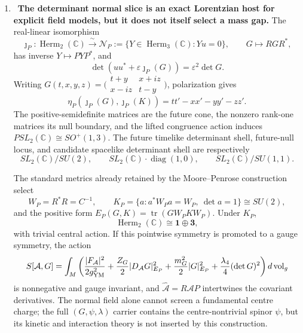 \begin{enumerate}[leftmargin=1.8em,itemsep=.65em]
\item \Verified\ \textbf{The determinant normal slice is an exact Lorentzian
host for explicit field models, but it does not itself select a mass gap.}
The real-linear isomorphism
\[
 \jmath_P:\operatorname{Herm}_2(\mathbb C)\xrightarrow{\ \sim\ }
 \mathcal N_P:=\{Y\in\operatorname{Herm}_3(\mathbb C):Yu=0\},
 \qquad G\longmapsto RGR^*,
\]
has inverse \(Y\mapsto PYP^*\), and
\[
 \det(uu^*+\varepsilon\jmath_P(G))=\varepsilon^2\det G.
\]
Writing
\(G(t,x,y,z)=
\bigl(\begin{smallmatrix}t+y&x+iz\\x-iz&t-y\end{smallmatrix}\bigr)\),
polarization gives
\[
 \eta_P(\jmath_P(G),\jmath_P(K))=tt'-xx'-yy'-zz'.
\]
The positive-semidefinite matrices are the future cone, the nonzero rank-one
matrices its null boundary, and the lifted congruence action induces
\(PSL_2(\mathbb C)\cong SO^+(1,3)\).  The future timelike determinant shell,
future-null locus, and candidate spacelike determinant shell are respectively
\[
 SL_2(\mathbb C)/SU(2),\qquad
 SL_2(\mathbb C)\cdot\operatorname{diag}(1,0),\qquad
 SL_2(\mathbb C)/SU(1,1).
\]

The standard metrics already retained by the Moore--Penrose construction
select
\[
 W_P=R^*R=C^{-1},\qquad
 K_P=\{a:a^*W_Pa=W_P,\ \det a=1\}\cong SU(2),
\]
and the positive form
\(E_P(G,K)=\operatorname{tr}(GW_PKW_P)\).  Under \(K_P\),
\[
 \operatorname{Herm}_2(\mathbb C)
 \cong\boldsymbol1\oplus\boldsymbol3,
\]
with trivial central action.  If this pointwise symmetry is promoted to a
gauge symmetry, the action
\[
 S[\mathcal A,G]=\int_M\left(
 \frac{|F_{\mathcal A}|^2}{2g_{\rm YM}^2}
 +\frac{Z_G}{2}|D_{\mathcal A}G|_{E_P}^2
 +\frac{m_G^2}{2}|G|_{E_P}^2
 +\frac{\lambda_4}{4}(\det G)^2\right)d\operatorname{vol}_g
\]
is nonnegative and gauge invariant, and
\(\widehat{\mathcal A}=R\mathcal A P\) intertwines the covariant
derivatives.  The normal field alone cannot screen a fundamental centre
charge; the full \((G,\psi,\lambda)\) carrier contains the centre-nontrivial
spinor \(\psi\), but its kinetic and interaction theory is not inserted by
this construction.


\end{enumerate}
